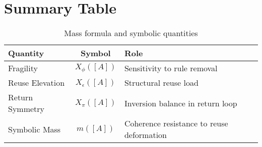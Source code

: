 \section{Summary Table}

\begin{table}[h!]
\centering
\begin{tabular}{|l|c|l|}
\hline
\textbf{Quantity} & \textbf{Symbol} & \textbf{Role} \\
\hline
Fragility & $X_\phi([A])$ & Sensitivity to rule removal \\
Reuse Elevation & $X_\epsilon([A])$ & Structural reuse load \\
Return Symmetry & $X_\pi([A])$ & Inversion balance in return loop \\
Symbolic Mass & $m([A])$ & Coherence resistance to reuse deformation \\
\hline
\end{tabular}
\caption{Mass formula and symbolic quantities}
\end{table}

